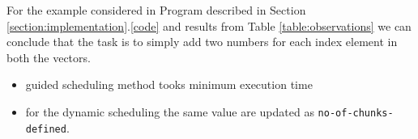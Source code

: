 \documentclass[paper=letter, fontsize=12pt]{article}
\begin{document}
For the example considered in Program described in Section \ref{section:implementation}.\ref{code} and results from Table \ref{table:observations} we can conclude that the task is to simply add two numbers for each index element in both the vectors.
\begin{itemize}
    \item guided scheduling method tooks minimum execution time
    \item for the dynamic scheduling the same value are updated as \verb|no-of-chunks-defined|.
\end{itemize}
\end{document}
